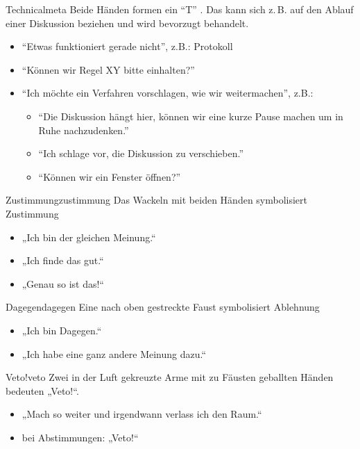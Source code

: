 \begin{handzeichen}{Technical}{meta}
Beide Händen formen ein \enquote{T} .
Das kann sich z.\,B. auf den Ablauf einer Diskussion beziehen und wird bevorzugt behandelt.
\begin{itemize}
	\item \enquote{Etwas funktioniert gerade nicht}, z.B.: Protokoll
	\item \enquote{Können wir Regel XY bitte einhalten?}
	\item \enquote{Ich möchte ein Verfahren vorschlagen, wie wir weitermachen}, z.B.:
	\begin{itemize}
	    \item \enquote{Die Diskussion hängt hier, können wir eine kurze Pause machen um in Ruhe nachzudenken.}
    	\item \enquote{Ich schlage vor, die Diskussion zu verschieben.}
	    \item \enquote{Können wir ein Fenster öffnen?}
	\end{itemize}
\end{itemize}
\end{handzeichen}

\begin{handzeichen}{Zustimmung}{zustimmung}
Das Wackeln mit beiden Händen symbolisiert Zustimmung 
\begin{itemize}
	\item „Ich bin der gleichen Meinung.“
	\item „Ich finde das gut.“
	\item „Genau so ist das!“
\end{itemize}
\end{handzeichen}

\begin{handzeichen}{Dagegen}{dagegen}
Eine nach oben gestreckte Faust symbolisiert Ablehnung
\begin{itemize}
	\item „Ich bin Dagegen.“
	\item „Ich habe eine ganz andere Meinung dazu.“
\end{itemize}
\end{handzeichen}

\begin{handzeichen}{Veto!}{veto}
Zwei in der Luft gekreuzte Arme mit zu Fäusten geballten Händen bedeuten „Veto!“.
\begin{itemize}
	\item „Mach so weiter und irgendwann verlass ich den Raum.“
	\item bei Abstimmungen: „Veto!“
\end{itemize}
\end{handzeichen}

